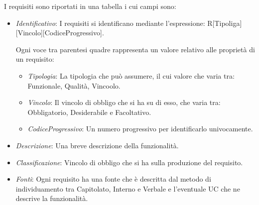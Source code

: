 \documentclass[../analisi-dei-requisiti.tex]{subfiles}
\begin{document}
I requisiti sono riportati in una tabella i cui campi sono:
\begin{itemize}
    \item\emph{Identificativo}: I requisiti si identificano mediante l'espressione: R[Tipoliga][Vincolo][CodiceProgressivo].
    
    Ogni voce tra parentesi quadre rappresenta un valore relativo alle proprietà di un requisito:
    \begin{itemize}
       
        \item \emph{Tipologia}: La tipologia che può assumere, il cui valore che varia tra: Funzionale, Qualità, Vincoolo.
        
        \item \emph{Vincolo}: Il vincolo di obbligo che si ha su di esso, che varia tra: Obbligatorio, Desiderabile e Facoltativo.
        \item \emph{CodiceProgressivo}: Un numero progressivo per identificarlo univocamente.
    \end{itemize} 

    \item \emph{Descrizione}: Una breve descrizione della funzionalità.
    \item \emph{Classificazione}: Vincolo di obbligo che si ha sulla produzione del requisito.
    \item \emph{Fonti}:   Ogni requisito ha una fonte che è descritta dal metodo di individuamento tra
                    Capitolato, Interno e Verbale e l'eventuale UC che ne descrive la funzionalità.

\end{itemize}



\newpage



\newpage



\newpage



\newpage



\newpage



\newpage


\end{document}
